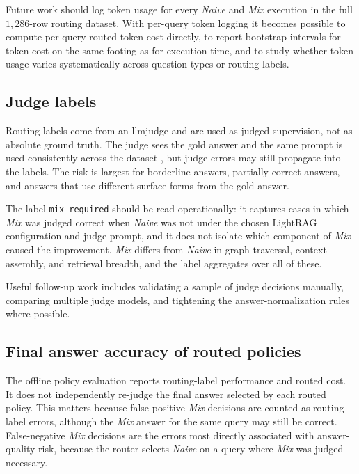 \documentclass[english, bibtex]{kththesis}               %
\numberwithin{listing}{chapter}
\begin{document}
Future work should log token usage for every \emph{Naive} and \emph{Mix} execution in the full $1{,}286$-row routing dataset. With per-query token logging it becomes possible to compute per-query routed token cost directly, to report bootstrap intervals for token cost on the same footing as for execution time, and to study whether token usage varies systematically across question types or routing labels.

\subsection{Judge labels}
\label{sec:limitJudgeLabels}

Routing labels come from an \gls{llmjudge} and are used as judged supervision, not as absolute ground truth. The judge sees the gold answer and the same prompt is used consistently across the dataset \cite{zheng2023judge}, but judge errors may still propagate into the labels. The risk is largest for borderline answers, partially correct answers, and answers that use different surface forms from the gold answer.

The label \texttt{mix\_required} should be read operationally: it captures cases in which \emph{Mix} was judged correct when \emph{Naive} was not under the chosen LightRAG configuration and judge prompt, and it does not isolate which component of \emph{Mix} caused the improvement. \emph{Mix} differs from \emph{Naive} in graph traversal, context assembly, and retrieval breadth, and the label aggregates over all of these.

Useful follow-up work includes validating a sample of judge decisions manually, comparing multiple judge models, and tightening the answer-normalization rules where possible.

\subsection{Final answer accuracy of routed policies}
\label{sec:limitFinalAnswerAccuracy}

The offline policy evaluation reports routing-label performance and routed cost. It does not independently re-judge the final answer selected by each routed policy. This matters because false-positive \emph{Mix} decisions are counted as routing-label errors, although the \emph{Mix} answer for the same query may still be correct. False-negative \emph{Mix} decisions are the errors most directly associated with answer-quality risk, because the router selects \emph{Naive} on a query where \emph{Mix} was judged necessary.
\end{document}
